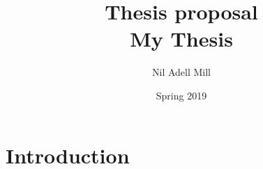 \documentclass{article}
\begin{document}

\title{\vspace{-0.5cm}\LARGE Thesis proposal \vspace{0.4cm} \\\huge My Thesis}
\author{Nil Adell Mill\vspace{0.2cm}} %
\date{Spring 2019}

\maketitle



    \section*{Introduction}
    
\end{document}
